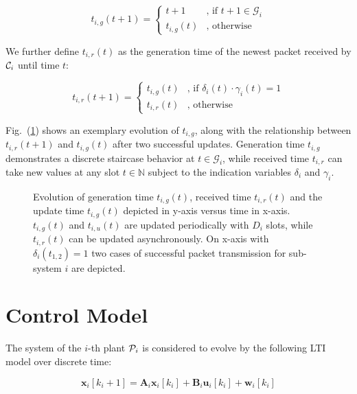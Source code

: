 \begin{equation}
  t_{i,g}(t+1) =
  \begin{cases}
  t+1 & \text{, if } t+1 \in \mathcal{G}_i \\
  t_{i,g}(t) & \text{, otherwise}	
  \end{cases}
\end{equation}

We further define $t_{i,r}(t)$ as the generation time of the newest packet
received by $\mathcal{C}_i$ until time $t$:

\begin{equation}
  t_{i, r}(t+1) =
  \begin{cases}
  t_{i, g}(t) & \text{, if } \delta_i(t) \cdot \gamma_i(t) = 1 \\
  t_{i, r}(t) & \text{, otherwise}	
  \end{cases}
\end{equation}

Fig.~(\ref{fig:ageplot}) shows an exemplary evolution of $t_{i,g}$, along with
the relationship between ${t_{i,r}(t+1)}$ and $t_{i,g}(t)$ after two successful
updates. Generation time $t_{i,g}$ demonstrates a discrete staircase behavior at
$t \in \mathcal{G}_i$, while received time $t_{i,r}$ can take new values at any
slot $t \in \mathbb{N}$ subject to the indication variables $\delta_i$ and
$\gamma_i$.

\begin{figure}[htb]
  \centering
  \resizebox*{.6\columnwidth}{!}{} 
  \caption[Example evolution of generation time $t_{i,g}$, received time
  $t_{i,r}$ and update time $t_{i,g}$]{Evolution of generation time
  $t_{i,g}(t)$, received time $t_{i,r}(t)$ and the update time $t_{i,g}(t)$
  depicted in y-axis versus time in x-axis. $t_{i,g}(t)$ and $t_{i,u}(t)$ are
  updated periodically with $D_i$ slots, while $t_{i,r}(t)$ can be updated
  asynchronously. On x-axis with $\delta_i(t_{1,2})=1$ two cases of successful
  packet transmission for sub-system $i$ are depicted.}
  \label{fig:ageplot}
\end{figure}  

\section{Control Model} \label{sec:control}

The system of the $i$-th plant $\mathcal{P}_i$ is considered to evolve by the following
LTI model over discrete time:

\begin{equation}
  \label{eq:discretemodel}
  \boldsymbol{x}_i[k_i+1] = \boldsymbol{A}_i \boldsymbol{x}_i[k_i] + \boldsymbol{B}_i \boldsymbol{u}_i[k_i] + \boldsymbol{w}_i[k_i]
\end{equation}

